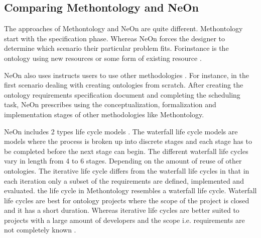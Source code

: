 \documentclass[12pt,a4paper]{article}
\begin{document}
\subsection{Comparing Methontology and NeOn}

The approaches of Methontology and NeOn are quite different. Methontology start with the specification phase. Whereas NeOn forces the designer to determine which scenario their particular problem fits. Forinstance is the ontology using new resources or some form of existing resource \citep{fernandez} \citep{gomez}.

NeOn also uses instructs users to use other methodologies \citep{gomez}. For instance, in the first scenario dealing with creating ontologies from scratch. After creating the ontology requirements specification document and completing the scheduling task, NeOn prescribes using the conceptualization, formalization and implementation stages of other methodologies like Methontology. 

NeOn includes 2 types life cycle models \citep{suarez}. The waterfall life cycle models are models where the process is broken up into discrete stages and each stage has to be completed before the next stage can begin. The different waterfall life cycles vary in length from 4 to 6 stages. Depending on the amount of reuse of other ontologies. The iterative life cycle differs from the waterfall life cycles in that in each iteration only a subset of the requirements are defined, implemented and evaluated. the life cycle in Methontology resembles a waterfall life cycle. Waterfall life cycles are best for ontology projects where the scope of the project is closed and it has a short duration. Whereas iterative life cycles are better suited to projects with a large amount of developers and the scope i.e. requirements are not completely known \citep{suarez}. 




\end{document}
